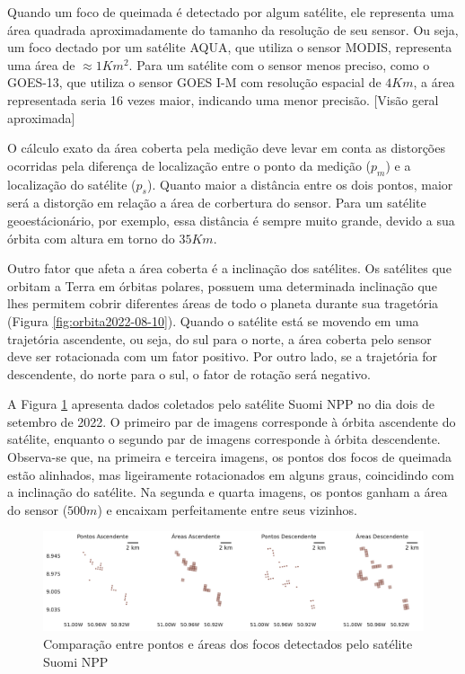 \documentclass[cic,tc]{iiufrgs}
\begin{document}
Quando um foco de queimada é detectado por algum satélite, ele representa uma área quadrada aproximadamente do tamanho da resolução de seu sensor. Ou seja, um foco dectado por um satélite AQUA, que utiliza o sensor MODIS, representa uma área de $\approx1Km^2$. Para um satélite com o sensor menos preciso, como o GOES-13, que utiliza o sensor GOES I-M com resolução espacial de $4Km$, a área representada seria 16 vezes maior, indicando uma menor precisão. [Visão geral aproximada] \par

O cálculo exato da área coberta pela medição deve levar em conta as distorções ocorridas pela diferença de localização entre o ponto da medição ($p_m$) e a localização  do satélite ($p_s$). Quanto maior a distância entre os dois pontos, maior será a distorção em relação a área de corbertura do sensor. Para um satélite geoestácionário, por exemplo, essa distância é sempre muito grande, devido a sua órbita com altura em torno do $35Km$. \par

Outro fator que afeta a área coberta é a inclinação dos satélites. Os satélites que orbitam a Terra em órbitas polares, possuem uma determinada inclinação que lhes permitem cobrir diferentes áreas de todo o planeta durante sua tragetória (Figura \ref{fig:orbita2022-08-10}). Quando o satélite está se movendo em uma trajetória ascendente, ou seja, do sul para o norte, a área coberta pelo sensor deve ser rotacionada com um fator positivo. Por outro lado, se a trajetória for descendente, do norte para o sul, o fator de rotação será negativo. \par

A Figura \ref{fig:comparacao_pontos_e_areas} apresenta dados coletados pelo satélite  Suomi NPP no dia dois de setembro de 2022. O primeiro par de imagens corresponde à órbita ascendente do satélite, enquanto o segundo par de imagens corresponde à órbita descendente. Observa-se que, na primeira e terceira imagens, os pontos dos focos de queimada estão alinhados, mas ligeiramente rotacionados em alguns graus, coincidindo com a inclinação do satélite. Na segunda e quarta imagens, os pontos ganham a área do sensor ($500m$) e encaixam perfeitamente entre seus vizinhos. \par

\begin{figure}[H]
    \caption{Comparação entre pontos e áreas dos focos detectados pelo satélite Suomi NPP}
    \begin{center}
        \includegraphics[width=35em]{comparacao_pontos_e_areas}
    \end{center}
    \label{fig:comparacao_pontos_e_areas}
\end{figure}
\end{document}
